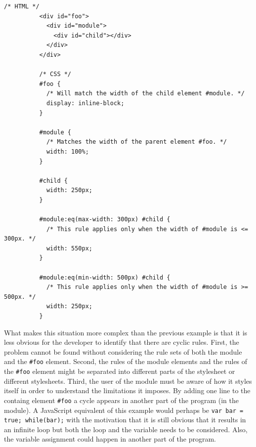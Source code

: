 \documentclass[a4paper,11pt]{kth-mag}
\newcommand{\code}[1]{\texttt{#1}}
\begin{document}
        \begin{lstlisting}[gobble=10,caption={Example of indirect cyclic rules. Here the user (\code{\#foo}) of the module (\code{\#module}) creates cyclic rules indirectly by specifying that it should match the width of the module.}, captionpos=b, label={code:cyclic-2}]
          /* HTML */
          <div id="foo">
            <div id="module">
              <div id="child"></div>
            </div>
          </div>

          /* CSS */
          #foo {
            /* Will match the width of the child element #module. */
            display: inline-block;
          }

          #module {
            /* Matches the width of the parent element #foo. */
            width: 100%;
          }

          #child {
            width: 250px;
          }

          #module:eq(max-width: 300px) #child {
            /* This rule applies only when the width of #module is <= 300px. */
            width: 550px;
          }

          #module:eq(min-width: 500px) #child {
            /* This rule applies only when the width of #module is >= 500px. */
            width: 250px;
          }
        \end{lstlisting}
        What makes this situation more complex than the previous example is that it is less obvious for the developer to identify that there are cyclic rules.
        First, the problem cannot be found without considering the rule sets of both the module and the \code{\#foo} element.
        Second, the rules of the module elements and the rules of the \code{\#foo} \gls{element} might be separated into different parts of the stylesheet or different stylesheets.
        Third, the user of the module must be aware of how it styles itself in order to understand the limitations it imposes.
        By adding one line to the containg element \code{\#foo} a cycle appears in another part of the program (in the module).
        A \gls{JavaScript} equivalent of this example would perhaps be \code{var bar = true; while(bar);} with the motivation that it is still obvious that it results in an infinite loop but both the loop and the variable needs to be considered.
        Also, the variable assignment could happen in another part of the program.
\end{document}
